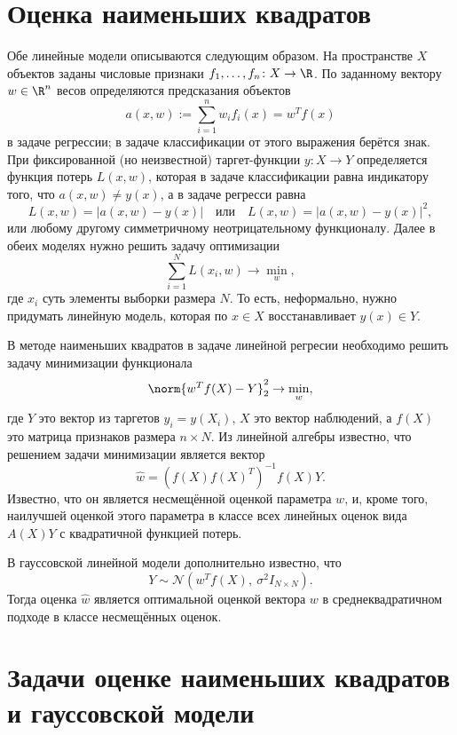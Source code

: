 \theoremstyle{plain}
    \newtheorem*{state}{Задача}

\newcommand\abs[1]{\ensuremath{\left\lvert#1\right\rvert}}
\newcommand{\Normald}{\mathcal{N}}

\section{Оценка наименьших квадратов}

Обе линейные модели описываются следующим образом.
На пространстве $X$ объектов заданы числовые признаки \( f_1, \ldots, f_n\colon X\to\R\). По заданному вектору \(w\in\R^n\) весов определяются предсказания объектов
\[
    a(x,w) := \sum_{i=1}^n w_if_i(x) = w^Tf(x)
\]
в задаче регрессии; в задаче классификации от этого выражения берётся знак. При фиксированной (но неизвестной) таргет-функции \( y\colon X\to Y\) определяется функция потерь \( L(x, w)\), которая в задаче классификации равна индикатору того, что \(a(x,w) \neq y(x)\), а в задаче регресси равна
\[
    L(x,w) = \abs{a(x,w)-y(x)}
    \quad\text{или}\quad
    L(x,w) = \abs{a(x,w)-y(x)}^2,
\]
или любому другому симметричному неотрицательному функционалу.
Далее в обеих моделях нужно решить задачу оптимизации
\[
    \sum_{i=1}^N L(x_i, w) \to \min_{w},
\]
где $x_i$ суть элементы выборки размера $N$. То есть, неформально, нужно придумать линейную модель, которая по $x \in X$ восстанавливает $y(x) \in Y$.

В методе наименьших квадратов в задаче линейной регресии необходимо решить задачу минимизации функционала
\[
    \norm{w^Tf(X) - Y}_2^2 \to \min_w,
\]
где $Y$ это вектор из таргетов $y_i = y(X_i)$, $X$ это вектор наблюдений, а $f(X)$ это матрица признаков размера $n \times N$.
Из линейной алгебры известно, что решением задачи минимизации является вектор
\[
    \hat{w} = (f(X)f(X)^T)^{-1}f(X)Y.
\]
Известно, что он является несмещённой оценкой параметра $w$, и, кроме того, наилучшей оценкой этого параметра в классе всех линейных оценок вида $A(X)Y$ с квадратичной функцией потерь.

В гауссовской линейной модели дополнительно известно, что
\[
    Y \sim \Normald\left( w^Tf(X),\ \sigma^2 I_{N\times N} \right).
\]
Тогда оценка $\hat{w}$ является оптимальной оценкой вектора $w$ в среднеквадратичном подходе в классе несмещённых оценок.

\section{Задачи оценке наименьших квадратов и гауссовской модели}

